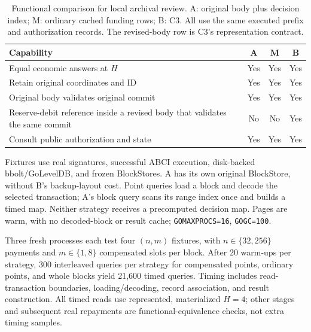 \begin{table}[t]
  \centering
  \caption{Functional comparison for local archival review. A: original
    body plus decision index; M: ordinary cached funding rows; B: C3.
    All use the same executed prefix and authorization records.
    The revised-body row is C3's representation contract.}
  \label{tab:c3-function}
  \small
  \begin{tabular}{@{}p{}ccc@{}}
    \toprule
    Capability & A & M & B \\
    \midrule
    Equal economic answers at $H$ & Yes & Yes & Yes \\
    Retain original coordinates and ID & Yes & Yes & Yes \\
    Original body validates original commit & Yes & Yes & Yes \\
    Reserve-debit reference inside a revised body that validates the same commit & No & No & Yes \\
    Consult public authorization and state & Yes & Yes & Yes \\
    \bottomrule
  \end{tabular}
\end{table}

Fixtures use real signatures, successful ABCI execution, disk-backed
bbolt/GoLevelDB, and frozen BlockStores. A has its own original
BlockStore, without B's backup-layout cost. Point queries load a block
and decode the selected transaction; A's block query scans its range
index once and builds a timed map. Neither strategy receives a
precomputed decision map. Pages are warm, with no decoded-block or
result cache; \texttt{GOMAXPROCS=16}, \texttt{GOGC=100}.

Three fresh processes each test four $(n,m)$ fixtures, with
$n\in\{32,256\}$ payments and $m\in\{1,8\}$ compensated slots per block.
After 20 warm-ups per strategy, 300 interleaved queries per strategy
for compensated points, ordinary points, and whole blocks yield
21,600 timed queries. Timing includes read-transaction boundaries,
loading/decoding, record association, and result construction.
All timed reads use represented, materialized $H=4$; other stages
and subsequent real repayments are functional-equivalence checks,
not extra timing samples.

